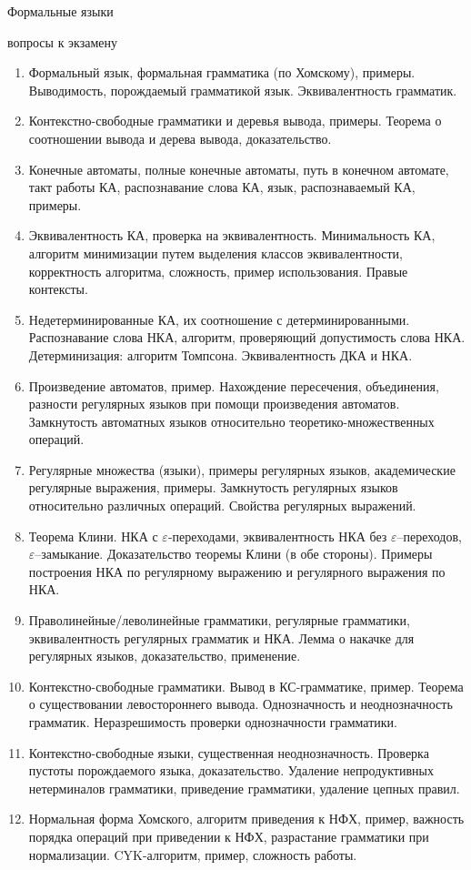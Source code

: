 \documentclass[12pt]{article}
\newcommand{\litem}[1]{\item #1 }%
\begin{document}
\begin{center}
{\LARGE Формальные языки}

{\Large вопросы к экзамену}
\end{center}

\medskip

\begin{enumerate}
\litem {Формальный язык, формальная грамматика (по Хомскому), примеры. Выводимость, порождаемый грамматикой язык. Эквивалентность грамматик.}
\litem {Контекстно-свободные грамматики и деревья вывода, примеры. Теорема о соотношении вывода и дерева вывода, доказательство.}
\litem {Конечные автоматы, полные конечные автоматы, путь в конечном автомате, такт работы КА, распознавание слова КА, язык, распознаваемый КА, примеры.}
\litem {Эквивалентность КА, проверка на эквивалентность. Минимальность КА, алгоритм минимизации путем выделения классов эквивалентности, корректность алгоритма, сложность, пример использования. Правые контексты.}
\litem {Недетерминированные КА, их соотношение с детерминированными. Распознавание слова НКА, алгоритм, проверяющий допустимость слова НКА. Детерминизация: алгоритм Томпсона. Эквивалентность ДКА и НКА.}
\litem {Произведение автоматов, пример. Нахождение пересечения, объединения, разности регулярных языков при помощи произведения автоматов. Замкнутость автоматных языков относительно теоретико-множественных операций.}
\litem {Регулярные множества (языки), примеры регулярных языков, академические регулярные выражения, примеры. Замкнутость регулярных языков относительно различных операций. Свойства регулярных выражений.}
\litem {Теорема Клини. НКА с $\varepsilon$-переходами, эквивалентность НКА без $\varepsilon$--переходов, $\varepsilon$--замыкание. Доказательство теоремы Клини (в обе стороны). Примеры построения НКА по регулярному выражению и регулярного выражения по НКА.}
\litem {Праволинейные/леволинейные грамматики, регулярные грамматики, эквивалентность регулярных грамматик и НКА. Лемма о накачке для регулярных языков, доказательство, применение.}
\litem {Контекстно-свободные грамматики. Вывод в КС-грамматике, пример. Теорема о существовании левостороннего вывода. Однозначность и неоднозначность грамматик. Неразрешимость проверки однозначности грамматики.}
\litem {Контекстно-свободные языки, существенная неоднозначность. Проверка пустоты порождаемого языка, доказательство. Удаление непродуктивных нетерминалов грамматики, приведение грамматики, удаление цепных правил.}
\litem {Нормальная форма Хомского, алгоритм приведения к НФХ, пример, важность порядка операций при приведении к НФХ, разрастание грамматики при нормализации. CYK-алгоритм, пример, сложность работы.}

\end{enumerate}
\end{document}
